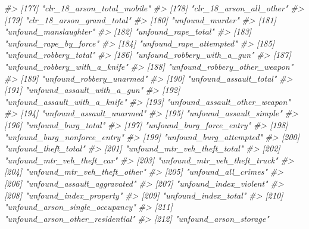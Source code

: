 \documentclass[
]{krantz}
\makeatletter
\newenvironment{Shaded}{\begin{snugshade}}{\end{snugshade}}
\newcommand{\CommentTok}[1]{\textcolor[rgb]{0.37,0.37,0.37}{\textit{#1}}}
\newenvironment{kframe}{%
\medskip{}
\setlength{\fboxsep}{.8em}
 \def\at@end@of@kframe{}%
 \ifinner\ifhmode%
  \def\at@end@of@kframe{\end{minipage}}%
  \begin{minipage}{\columnwidth}%
 \fi\fi%
 \def\FrameCommand##1{\hskip\@totalleftmargin \hskip-\fboxsep
 \colorbox{shadecolor}{##1}\hskip-\fboxsep
     \hskip-\linewidth \hskip-\@totalleftmargin \hskip\columnwidth}%
 \MakeFramed {\advance\hsize-\width
   \@totalleftmargin\z@ \linewidth\hsize
   \@setminipage}}%
 {\par\unskip\endMakeFramed%
 \at@end@of@kframe}
\renewenvironment{Shaded}{\begin{kframe}}{\end{kframe}}
\makeatother
\begin{document}
\begin{Shaded}
\begin{Highlighting}[]
\CommentTok{\#\textgreater{} [177] "clr\_18\_arson\_total\_mobile"       }
\CommentTok{\#\textgreater{} [178] "clr\_18\_arson\_all\_other"          }
\CommentTok{\#\textgreater{} [179] "clr\_18\_arson\_grand\_total"        }
\CommentTok{\#\textgreater{} [180] "unfound\_murder"                  }
\CommentTok{\#\textgreater{} [181] "unfound\_manslaughter"            }
\CommentTok{\#\textgreater{} [182] "unfound\_rape\_total"              }
\CommentTok{\#\textgreater{} [183] "unfound\_rape\_by\_force"           }
\CommentTok{\#\textgreater{} [184] "unfound\_rape\_attempted"          }
\CommentTok{\#\textgreater{} [185] "unfound\_robbery\_total"           }
\CommentTok{\#\textgreater{} [186] "unfound\_robbery\_with\_a\_gun"      }
\CommentTok{\#\textgreater{} [187] "unfound\_robbery\_with\_a\_knife"    }
\CommentTok{\#\textgreater{} [188] "unfound\_robbery\_other\_weapon"    }
\CommentTok{\#\textgreater{} [189] "unfound\_robbery\_unarmed"         }
\CommentTok{\#\textgreater{} [190] "unfound\_assault\_total"           }
\CommentTok{\#\textgreater{} [191] "unfound\_assault\_with\_a\_gun"      }
\CommentTok{\#\textgreater{} [192] "unfound\_assault\_with\_a\_knife"    }
\CommentTok{\#\textgreater{} [193] "unfound\_assault\_other\_weapon"    }
\CommentTok{\#\textgreater{} [194] "unfound\_assault\_unarmed"         }
\CommentTok{\#\textgreater{} [195] "unfound\_assault\_simple"          }
\CommentTok{\#\textgreater{} [196] "unfound\_burg\_total"              }
\CommentTok{\#\textgreater{} [197] "unfound\_burg\_force\_entry"        }
\CommentTok{\#\textgreater{} [198] "unfound\_burg\_nonforce\_entry"     }
\CommentTok{\#\textgreater{} [199] "unfound\_burg\_attempted"          }
\CommentTok{\#\textgreater{} [200] "unfound\_theft\_total"             }
\CommentTok{\#\textgreater{} [201] "unfound\_mtr\_veh\_theft\_total"     }
\CommentTok{\#\textgreater{} [202] "unfound\_mtr\_veh\_theft\_car"       }
\CommentTok{\#\textgreater{} [203] "unfound\_mtr\_veh\_theft\_truck"     }
\CommentTok{\#\textgreater{} [204] "unfound\_mtr\_veh\_theft\_other"     }
\CommentTok{\#\textgreater{} [205] "unfound\_all\_crimes"              }
\CommentTok{\#\textgreater{} [206] "unfound\_assault\_aggravated"      }
\CommentTok{\#\textgreater{} [207] "unfound\_index\_violent"           }
\CommentTok{\#\textgreater{} [208] "unfound\_index\_property"          }
\CommentTok{\#\textgreater{} [209] "unfound\_index\_total"             }
\CommentTok{\#\textgreater{} [210] "unfound\_arson\_single\_occupancy"  }
\CommentTok{\#\textgreater{} [211] "unfound\_arson\_other\_residential" }
\CommentTok{\#\textgreater{} [212] "unfound\_arson\_storage"           }

\end{Highlighting}
\end{Shaded}
\end{document}
